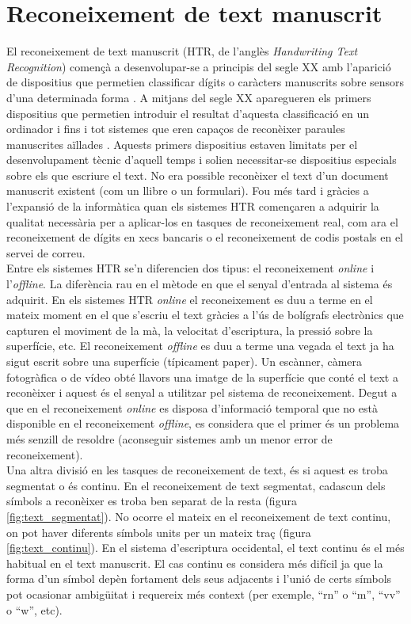 \section{Reconeixement de text manuscrit}
El reconeixement de text manuscrit (HTR, de l'anglès \emph{Handwriting Text Recognition}) començà a desenvolupar-se a principis del segle XX amb l'aparició de dispositius que permetien classificar dígits o caràcters manuscrits sobre sensors d'una determinada forma \cite{Goldberg1914}. A mitjans del segle XX aparegueren els primers dispositius que permetien introduir el resultat d'aquesta classificació en un ordinador \cite{10.1109/AFIPS.1957.60} i fins i tot sistemes que eren capaços de reconèixer paraules manuscrites aïllades \cite{Harmon1962}. Aquests primers dispositius estaven limitats per el desenvolupament tècnic d'aquell temps i solien necessitar-se dispositius especials sobre els que escriure el text. No era possible reconèixer el text d'un document manuscrit existent (com un llibre o un formulari). Fou més tard i gràcies a l'expansió de la informàtica quan els sistemes HTR començaren a adquirir la qualitat necessària per a aplicar-los en tasques de reconeixement real, com ara el reconeixement de dígits en xecs bancaris o el reconeixement de codis postals en el servei de correu.\\

Entre els sistemes HTR se'n diferencien dos tipus: el reconeixement \emph{online} i l'\emph{offline}. La diferència rau en el mètode en que el senyal d'entrada al sistema és adquirit. En els sistemes HTR \emph{online} el reconeixement es duu a terme en el mateix moment en el que s'escriu el text gràcies a l'ús de bolígrafs electrònics que capturen el moviment de la mà, la velocitat d'escriptura, la pressió sobre la superfície, etc. El reconeixement \emph{offline} es duu a terme una vegada el text ja ha sigut escrit sobre una superfície (típicament paper). Un escànner, càmera fotogràfica o de vídeo obté llavors una imatge de la superfície que conté el text a reconèixer i aquest és el senyal a utilitzar pel sistema de reconeixement. Degut a que en el reconeixement \emph{online} es disposa d'informació temporal que no està disponible en el reconeixement \emph{offline}, es considera que el primer és un problema més senzill de resoldre (aconseguir sistemes amb un menor error de reconeixement).\\

Una altra divisió en les tasques de reconeixement de text, és si aquest es troba segmentat o és continu. En el reconeixement de text segmentat, cadascun dels símbols a reconèixer es troba ben separat de la resta (figura \ref{fig:text_segmentat}). No ocorre el mateix en el reconeixement de text continu, on pot haver diferents símbols units per un mateix traç (figura \ref{fig:text_continu}). En el sistema d'escriptura occidental, el text continu és el més habitual en el text manuscrit. El cas continu es considera més difícil ja que la forma d'un símbol depèn fortament dels seus adjacents i l'unió de certs símbols pot ocasionar ambigüitat i requereix més context (per exemple, ``rn'' o ``m'', ``vv'' o ``w'', etc).\\

